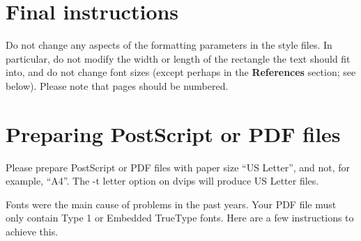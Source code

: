 \documentclass{article} %
\begin{document}
\section{Final instructions}
Do not change any aspects of the formatting parameters in the style files.
In particular, do not modify the width or length of the rectangle the text
should fit into, and do not change font sizes (except perhaps in the
\textbf{References} section; see below). Please note that pages should be
numbered.

\section{Preparing PostScript or PDF files}

Please prepare PostScript or PDF files with paper size ``US Letter'', and
not, for example, ``A4''. The -t
letter option on dvips will produce US Letter files.

Fonts were the main cause of problems in the past years. Your PDF file must
only contain Type 1 or Embedded TrueType fonts. Here are a few instructions
to achieve this.
\end{document}
